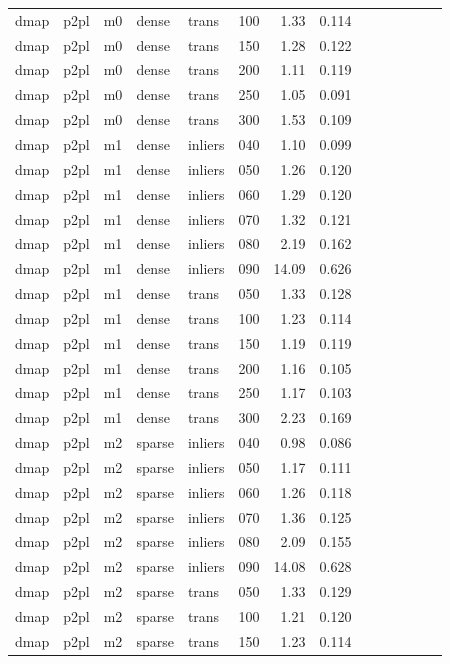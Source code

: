 \begin{table}[htbp]
\begin{tabular}{llllllrrrrrrrr}
  dmap & p2pl & m0 & dense & trans & 100 & 1.33 & 0.114 \\
  dmap & p2pl & m0 & dense & trans & 150 & 1.28 & 0.122 \\
  dmap & p2pl & m0 & dense & trans & 200 & 1.11 & 0.119 \\
  dmap & p2pl & m0 & dense & trans & 250 & 1.05 & 0.091 \\
  dmap & p2pl & m0 & dense & trans & 300 & 1.53 & 0.109 \\
  dmap & p2pl & m1 & dense & inliers & 040 & 1.10 & 0.099 \\
  dmap & p2pl & m1 & dense & inliers & 050 & 1.26 & 0.120 \\
  dmap & p2pl & m1 & dense & inliers & 060 & 1.29 & 0.120 \\
  dmap & p2pl & m1 & dense & inliers & 070 & 1.32 & 0.121 \\
  dmap & p2pl & m1 & dense & inliers & 080 & 2.19 & 0.162 \\
  dmap & p2pl & m1 & dense & inliers & 090 & 14.09 & 0.626 \\
  dmap & p2pl & m1 & dense & trans & 050 & 1.33 & 0.128 \\
  dmap & p2pl & m1 & dense & trans & 100 & 1.23 & 0.114 \\
  dmap & p2pl & m1 & dense & trans & 150 & 1.19 & 0.119 \\
  dmap & p2pl & m1 & dense & trans & 200 & 1.16 & 0.105 \\
  dmap & p2pl & m1 & dense & trans & 250 & 1.17 & 0.103 \\
  dmap & p2pl & m1 & dense & trans & 300 & 2.23 & 0.169 \\
  dmap & p2pl & m2 & sparse & inliers & 040 & 0.98 & 0.086 \\
  dmap & p2pl & m2 & sparse & inliers & 050 & 1.17 & 0.111 \\
  dmap & p2pl & m2 & sparse & inliers & 060 & 1.26 & 0.118 \\
  dmap & p2pl & m2 & sparse & inliers & 070 & 1.36 & 0.125 \\
  dmap & p2pl & m2 & sparse & inliers & 080 & 2.09 & 0.155 \\
  dmap & p2pl & m2 & sparse & inliers & 090 & 14.08 & 0.628 \\
  dmap & p2pl & m2 & sparse & trans & 050 & 1.33 & 0.129 \\
  dmap & p2pl & m2 & sparse & trans & 100 & 1.21 & 0.120 \\
  dmap & p2pl & m2 & sparse & trans & 150 & 1.23 & 0.114 \\

\end{tabular}
\end{table}

